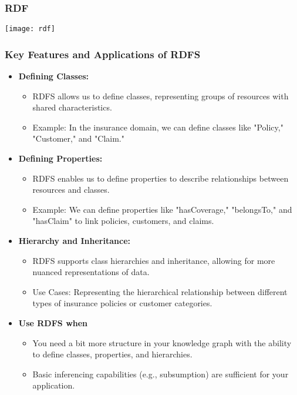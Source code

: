 \begin{frame}[fragile]\frametitle{RDF}

\begin{center}
\texttt{[image: rdf]}
\end{center}	  
\end{frame}


\begin{frame}[fragile]
\frametitle{Key Features and Applications of RDFS}
\begin{itemize}
\item \textbf{Defining Classes:}
\begin{itemize}
\item RDFS allows us to define classes, representing groups of resources with shared characteristics.
\item Example: In the insurance domain, we can define classes like "Policy," "Customer," and "Claim."
\end{itemize}

\item \textbf{Defining Properties:}
\begin{itemize}
\item RDFS enables us to define properties to describe relationships between resources and classes.
\item Example: We can define properties like "hasCoverage," "belongsTo," and "hasClaim" to link policies, customers, and claims.
\end{itemize}

\item \textbf{Hierarchy and Inheritance:}
\begin{itemize}
\item RDFS supports class hierarchies and inheritance, allowing for more nuanced representations of data.
\item Use Cases: Representing the hierarchical relationship between different types of insurance policies or customer categories.
\end{itemize}

\item \textbf{Use RDFS when}
\begin{itemize}
\item You need a bit more structure in your knowledge graph with the ability to define classes, properties, and hierarchies.
\item Basic inferencing capabilities (e.g., subsumption) are sufficient for your application.
\end{itemize}

\end{itemize}
\end{frame}

